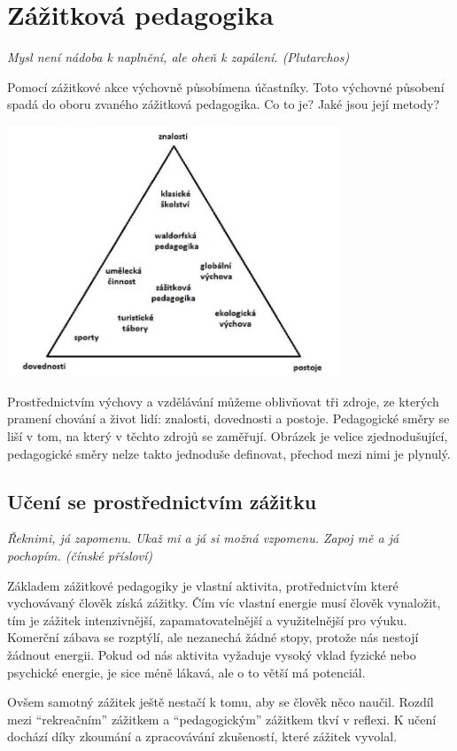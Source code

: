 \documentclass[a4paper,12pt,final]{report}
\begin{document}
\section[Zážitková pedagogika]{Zážitková pedagogika}
\textit{Mysl není nádoba k naplnění, ale oheň k zapálení. (Plutarchos)}

Pomocí zážitkové akce výchovně působímena účastníky. Toto výchovné působení spadá do oboru zvaného zážitková pedagogika. Co to je? Jaké jsou její metody?

\includegraphics[width=0.75\textwidth]{zdroje/pedag-zamereni.jpg}

Prostřednictvím výchovy a vzdělávání můžeme oblivňovat tři zdroje, ze kterých pramení chování a život lidí: znalosti, dovednosti a postoje. Pedagogické směry se liší v tom, na který v těchto zdrojů se zaměřují. Obrázek je velice zjednodušující, pedagogické směry nelze takto jednoduše definovat, přechod mezi nimi je plynulý.

\subsection*{Učení se prostřednictvím zážitku}\pagelogos
\textit{Řeknimi, já zapomenu. Ukaž mi a já si možná vzpomenu. Zapoj mě a já pochopím. (čínské přísloví)}

Základem zážitkové pedagogiky je vlastní aktivita, protřednictvím které vychovávaný člověk získá zážitky. Čím víc vlastní energie musí člověk vynaložit, tím je zážitek intenzivnější, zapamatovatelnější a využitelnější pro výuku. Komerční zábava se rozptýlí, ale nezanechá žádné stopy, protože nás nestojí žádnout energii. Pokud od nás aktivita vyžaduje vysoký vklad fyzické nebo psychické energie, je sice méně lákavá, ale o to větší má potenciál.

Ovšem samotný zážitek ještě nestačí k tomu, aby se člověk něco naučil. Rozdíl mezi ``rekreačním'' zážitkem a ``pedagogickým'' zážitkem tkví v reflexi. K učení dochází díky zkoumání a zpracovávání zkušeností, které zážitek vyvolal.
\end{document}
